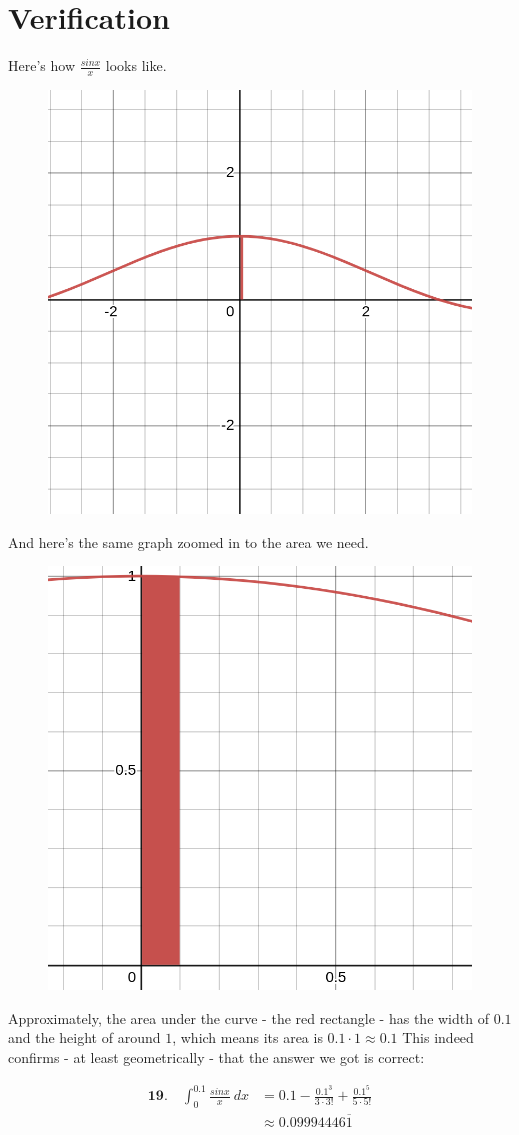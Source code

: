 \newpage

\section*{Verification}

Here's how $ \frac{sinx}{x} $
looks like.

\begin{figure}
	\centering
	\includegraphics[width=0.43\linewidth]{verification1}
	\caption{}
	\label{fig:verification1}
\end{figure}

And here's the same graph
zoomed in to the area we need.

\begin{figure}
	\centering
	\includegraphics[width=0.43\linewidth]{verification2}
	\caption{}
	\label{fig:verification2}
\end{figure}

Approximately, the area under
the curve - the red rectangle -
has the width of
$ 0.1 $ and the height of 
around $ 1 $, which means its
area is $ 0.1 \cdot 1 \approx 0.1 $
This indeed confirms - at least
geometrically - that the answer we 
got is correct:

\begin{align}
	\textbf{19.}\quad \int_{0}^{0.1} 
	\frac{sinx}{x}\ dx
	&=
	0.1 
	-
	\frac{
		0.1^{3}
	}{
		3\cdot3!
	}
	+
	\frac{
		0.1^{5}
	}{
		5\cdot5!
	} \\
	&\approx
	0.09994446\overline{1}
\end{align}


